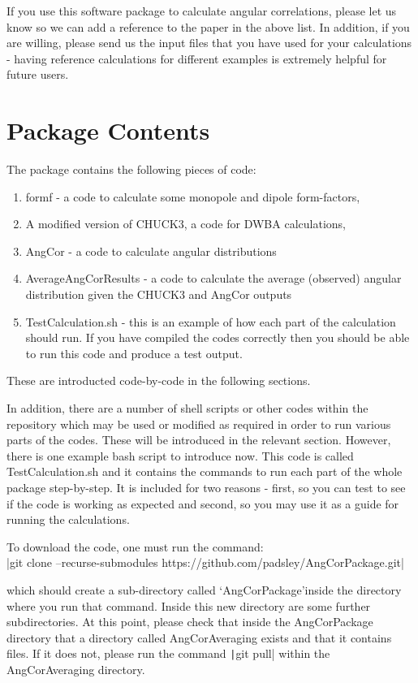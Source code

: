 \documentclass[a4paper,10pt]{article}
\begin{document}
If you use this software package to calculate angular correlations, please let us know so we can add a reference to the paper in the above list. In addition, if you are willing, please send us the input files that you have used for your calculations - having reference calculations for different examples is extremely helpful for future users.

\section{Package Contents}

The package contains the following pieces of code:

\begin{enumerate}
 \item formf - a code to calculate some monopole and dipole form-factors,
 \item A modified version of CHUCK3, a code for DWBA calculations,
 \item AngCor - a code to calculate angular distributions
 \item AverageAngCorResults - a code to calculate the average (observed) angular distribution given the CHUCK3 and AngCor outputs
 \item TestCalculation.sh - this is an example of how each part of the calculation should run. If you have compiled the codes correctly then you should be able to run this code and produce a test output.
\end{enumerate}

These are introducted code-by-code in the following sections.

In addition, there are a number of shell scripts or other codes within the repository which may be used or modified as required in order to run various parts of the codes. These will be introduced in the relevant section. However, there is one example bash script to introduce now. This code is called TestCalculation.sh and it contains the commands to run each part of the whole package step-by-step. It is included for two reasons - first, so you can test to see if the code is working as expected and second, so you may use it as a guide for running the calculations.

To download the code, one must run the command:\\
|git clone --recurse-submodules https://github.com/padsley/AngCorPackage.git|

which should create a sub-directory called \textquoteleft AngCorPackage\textquoteright inside the directory where you run that command. Inside this new directory are some further subdirectories. At this point, please check that inside the AngCorPackage directory that a directory called AngCorAveraging exists and that it contains files. If it does not, please run the command \texttt|git pull| within the AngCorAveraging directory.
\end{document}
